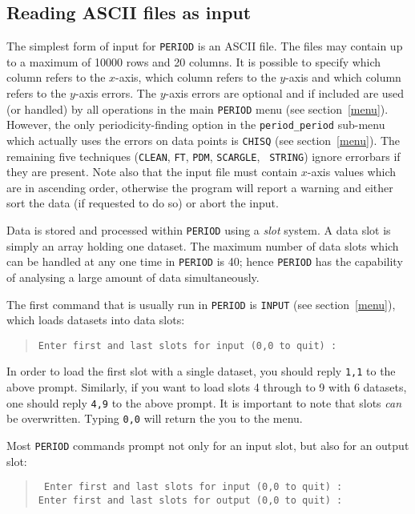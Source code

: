 \subsection{Reading ASCII files as input}
\label{slots1}

The simplest form of input for {\tt PERIOD} is an ASCII file.  The
files may contain up to a maximum of 10000 rows and 20 columns. It is
possible to specify which column refers to the $x$-axis, which column
refers to the $y$-axis and which column refers to the $y$-axis errors.
The $y$-axis errors are optional and if included are used (or handled)
by all operations in the main {\tt PERIOD} menu (see
section~\ref{menu}).  However, the only periodicity-finding option in
the {\tt period\_period} sub-menu which actually uses the errors on
data points is {\tt CHISQ} (see section~\ref{menu}). The remaining five
techniques ({\tt CLEAN}, {\tt FT}, {\tt PDM}, {\tt SCARGLE}, {\tt
STRING}) ignore errorbars if they are present. Note also that the input
file must contain $x$-axis values which are in ascending order,
otherwise the program will report a warning and either sort the data
(if requested to do so) or abort the input.

Data is stored and processed within {\tt PERIOD} using a {\em slot} system.
A data slot is simply an array holding one dataset. The maximum number
of data slots which can be handled at any one time in {\tt PERIOD} is 40;
hence {\tt PERIOD} has the capability of analysing a large amount of data
simultaneously. 

The first command that is usually run in {\tt PERIOD} is {\tt INPUT}
(see section~\ref{menu}), which loads datasets into data slots:

\begin{quote}
{\tt Enter first and last slots for input (0,0 to quit) :}
\end{quote}

In order to load the first slot with a single dataset, you should reply 
{\tt 1,1} to the above prompt. Similarly, if you want to load slots
4 through to 9 with 6 datasets, one should reply {\tt 4,9} to the above
prompt. It is important to note that slots {\em can} be overwritten.
Typing {\tt 0,0} will return the you to the menu. 

Most {\tt PERIOD} commands prompt not only for an input slot, but also for
an output slot:

\begin{quote}{\tt
Enter first and last slots for input  (0,0 to quit) : \\
Enter first and last slots for output (0,0 to quit) : }
\end{quote}

